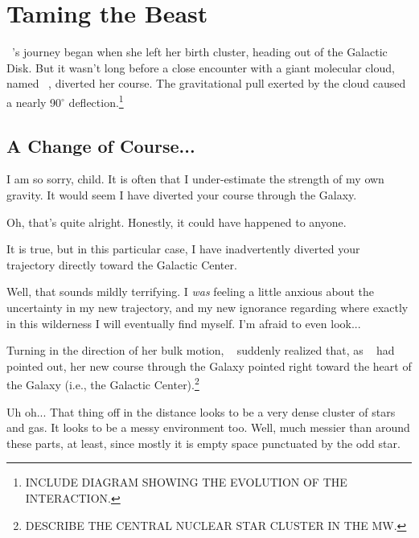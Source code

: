 \documentclass[main.tex]{subfiles}
\begin{document}
\chapter{Taming the Beast}


\par \nar \rmelectra~'s journey began when she left her birth cluster, heading out of the Galactic Disk.  But it wasn't long before a close encounter with a giant molecular cloud, named \rmaethra~, diverted her course.  The gravitational pull exerted by the cloud caused a nearly 90$^{\circ}$ deflection.\footnote{INCLUDE DIAGRAM SHOWING THE EVOLUTION OF THE INTERACTION.}  

\section{A Change of Course...}

\par \Aethra I am so sorry, child.  It is often that I under-estimate the strength of my own gravity.  It would seem I have diverted your course through the Galaxy.

\par \Electra Oh, that's quite alright.  Honestly, it could have happened to anyone.

\par \Aethra It is true, but in this particular case, I have inadvertently diverted your trajectory directly toward the Galactic Center.

\par \Electra Well, that sounds mildly terrifying.  I \textit{was} feeling a little anxious about the uncertainty in my new trajectory, and my new ignorance regarding where exactly in this wilderness I will eventually find myself.  I'm afraid to even look...

\par \nar Turning in the direction of her bulk motion, \rmelectra~ suddenly realized that, as \rmaethra~ had pointed out, her new course through the Galaxy pointed right toward the heart of the Galaxy (i.e., the Galactic Center).\footnote{DESCRIBE THE CENTRAL NUCLEAR STAR CLUSTER IN THE MW.}

\par \Electra Uh oh...  That thing off in the distance looks to be a very dense cluster of stars and gas.  It looks to be a messy environment too.  Well, much messier than around these parts, at least, since mostly it is empty space punctuated by the odd star.
\end{document}
